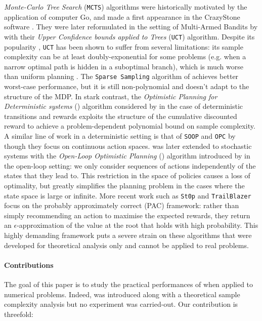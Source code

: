 \documentclass[runningheads, envcountsame, a4paper]{llncs}
\newcommand{\citep}{\cite}
\newcommand{\citet}{\cite}
\begin{document}
\emph{Monte-Carlo Tree Search} (\texttt{MCTS}) algorithms were historically motivated by the application of computer Go, and made a first appearance in the CrazyStone software \citet{Coulom2006}. They were later reformulated in the setting of Multi-Armed Bandits by \citet{Kocsis2006} with their \emph{Upper Confidence bounds applied to Trees} (\texttt{UCT}) algorithm. Despite its popularity \citep{Silver2016,Silver2017,Silver2018}, \texttt{UCT} has been shown to suffer from several limitations: its sample complexity can be at least doubly-exponential for some problems (e.g. when a narrow optimal path is hidden in a suboptimal branch), which is much worse than uniform planning \citep{Coquelin2007}. The \texttt{Sparse Sampling} algorithm of \citet{Kearns2002} achieves better worst-case performance, but it is still non-polynomial and doesn't adapt to the structure of the MDP. In stark contrast, the \emph{Optimistic Planning for Deterministic systems} (\OPD) algorithm considered by \citet{Hren2008} in the case of deterministic transitions and rewards exploits the structure of the cumulative discounted reward to achieve a problem-dependent polynomial bound on sample complexity. A similar line of work in a deterministic setting is that of \texttt{SOOP} and \texttt{OPC} by \cite{Busoniu2013,Busoniu2018} though they focus on continuous action spaces. \OPD was later extended to stochastic systems with the \emph{Open-Loop Optimistic Planning} (\OLOP) algorithm introduced by \citet{Bubeck2010} in the open-loop setting: we only consider sequences of actions independently of the states that they lead to. This restriction in the space of policies causes a loss of optimality, but greatly simplifies the planning problem in the cases where the state space is large or infinite. More recent work such as \texttt{St0p} \citep{Szorenyi2014} and \texttt{TrailBlazer} \citep{Grill2016} focus on the probably approximately correct (PAC) framework: rather than simply recommending an action to maximise the expected rewards, they return an $\epsilon$-approximation of the value at the root that holds with high probability. This highly demanding framework puts a severe strain on these algorithms that were developed for theoretical analysis only and cannot be applied to real problems.

\paragraph{Contributions} The goal of this paper is to study the practical performances of \OLOP when applied to numerical problems. Indeed, \OLOP was introduced along with a theoretical sample complexity analysis but no experiment was carried-out. Our contribution is threefold:
\end{document}
